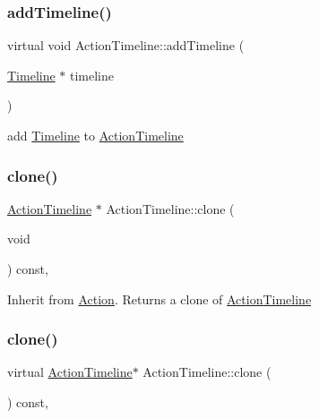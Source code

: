 \subsubsection{\texorpdfstring{add\+Timeline()}{addTimeline()}\hspace{0.1cm}{\footnotesize\ttfamily [2/2]}}
{\footnotesize\ttfamily virtual void Action\+Timeline\+::add\+Timeline (\begin{DoxyParamCaption}\item[{\hyperlink{classTimeline}{Timeline} $\ast$}]{timeline }\end{DoxyParamCaption})\hspace{0.3cm}{\ttfamily [virtual]}}

add \hyperlink{classTimeline}{Timeline} to \hyperlink{classActionTimeline}{Action\+Timeline} \mbox{\label{classActionTimeline_a13de8442dc106f192f3d5b3d5639842d}} 
\subsubsection{\texorpdfstring{clone()}{clone()}\hspace{0.1cm}{\footnotesize\ttfamily [1/2]}}
{\footnotesize\ttfamily \hyperlink{classActionTimeline}{Action\+Timeline} $\ast$ Action\+Timeline\+::clone (\begin{DoxyParamCaption}\item[{void}]{ }\end{DoxyParamCaption}) const\hspace{0.3cm}{\ttfamily [override]}, {\ttfamily [virtual]}}

Inherit from \hyperlink{classAction}{Action}. Returns a clone of \hyperlink{classActionTimeline}{Action\+Timeline} \mbox{\label{classActionTimeline_a38315f4351ad806d36f607acc70a3e7a}} 
\subsubsection{\texorpdfstring{clone()}{clone()}\hspace{0.1cm}{\footnotesize\ttfamily [2/2]}}
{\footnotesize\ttfamily virtual \hyperlink{classActionTimeline}{Action\+Timeline}$\ast$ Action\+Timeline\+::clone (\begin{DoxyParamCaption}{ }\end{DoxyParamCaption}) const\hspace{0.3cm}{\ttfamily [override]}, {\ttfamily [virtual]}}

